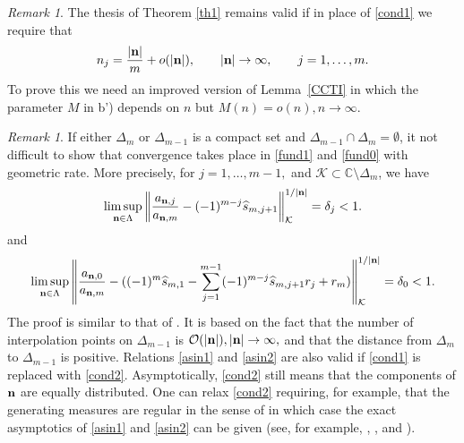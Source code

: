 \documentclass[10pt,a4paper]{article}
\theoremstyle{definition}
\theoremstyle{remark}
\newtheorem{remark}[theorem]{Remark}
\numberwithin{equation}{section}
\begin{document}
\begin{remark} The thesis of Theorem \ref{th1} remains valid if in place of  \eqref{cond1} we require that
\begin{equation} \label{cond2} n_j  =  \frac{|{\bf n}|}{m}  + o(|{\bf n}|),\qquad   |{\bf n}| \to \infty ,  \qquad j=1,\ldots,m.
\end{equation}
To prove this we need an improved version of Lemma~\ref{CCTI} in which  the parameter $M$ in b')  depends on $n$ but $M(n) = o(n), n \to \infty$.
\end{remark}

\begin{remark} If either $\Delta_m$ or $\Delta_{m-1}$ is a compact set and $\Delta_{m-1} \cap \Delta_{m} = \emptyset$, it not difficult to show that convergence takes place in \eqref{fund1} and \eqref{fund0} with geometric rate. More precisely, for $j=1,\ldots,m-1,$ and $\mathcal{K} \subset \mathbb{C} \setminus \Delta_m$, we have
\begin{equation} \label{asin1} \limsup_{{\bf n} \in \Lambda} \left\|\frac{a_{{\bf n}, j}}{a_{{\bf n},m}} - (-1)^{m-j}\widehat{s}_{m,j+1} \right\|_{\mathcal{K}}^{1/|{\bf n}|} = \delta_j < 1.
\end{equation}
and
\begin{equation} \label{asin2} \limsup_{{\bf n} \in \Lambda} \left\|\frac{a_{{\bf n}, 0}}{a_{{\bf n},m}} -
((-1)^{m}\widehat{s}_{m,1}-\sum_{j=1}^{m-1}(-1)^{m-j}\widehat{s}_{m,j+1}r_j+r_m) \right\|_{\mathcal{K}}^{1/|{\bf n}|} = \delta_0 < 1.
\end{equation}
The proof  is similar to that of \cite[Corollary 1]{FL2}. It is based on the fact that the number of interpolation points on $\Delta_{m-1}$ is $\mathcal{O}(|{\bf n}|), |{\bf n}| \to \infty,$ and that the distance from $\Delta_m$ to $\Delta_{m-1}$ is positive. Relations \eqref{asin1} and \eqref{asin2} are also valid if \eqref{cond1} is replaced with \eqref{cond2}.
Asymptotically, \eqref{cond2} still means that the components of $\bf n$ are equally distributed. One can relax \eqref{cond2} requiring, for example, that the generating measures are regular in the sense of \cite[Chapter 3]{stto} in which case the exact asymptotics of \eqref{asin1} and \eqref{asin2} can be given (see, for example, \cite{Nik0}, \cite[Chapter 5, Section 7]{NS}, and \cite[Theorem 5.1, Corollary 5.3]{FLLS}).
\end{remark}
\end{document}
